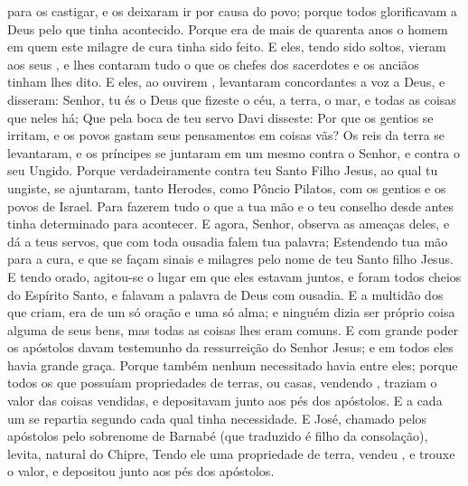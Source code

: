 {{} para os castigar, e os deixaram ir por causa do povo; porque todos glorificavam a Deus pelo que tinha acontecido.
Porque era de mais de quarenta anos o homem em quem este milagre de cura tinha sido feito.
E eles, tendo sido soltos, vieram aos seus
{} , e lhes contaram tudo o que os chefes dos sacerdotes e os anciãos tinham lhes dito.
E eles, ao ouvirem
{} , levantaram concordantes a voz a Deus, e disseram: Senhor, tu és o Deus que fizeste o céu, a terra, o mar, e todas as coisas que neles há;
Que pela boca de teu servo Davi disseste: Por que os gentios se irritam, e os povos gastam seus pensamentos em coisas vãs?
Os reis da terra se levantaram, e os príncipes se juntaram em um mesmo
{} contra o Senhor, e contra o seu Ungido.
Porque verdadeiramente contra teu Santo Filho Jesus, ao qual tu ungiste, se ajuntaram, tanto Herodes, como Pôncio Pilatos, com os gentios e os povos de Israel.
Para fazerem tudo o que a tua mão e o teu conselho desde antes tinha determinado para acontecer.
E agora, Senhor, observa as ameaças deles, e dá a teus servos, que com toda ousadia falem tua palavra;
Estendendo tua mão para a cura, e que se façam sinais e milagres pelo nome de teu Santo filho Jesus.
E tendo orado, agitou-se o lugar em que eles estavam juntos, e foram todos cheios do Espírito Santo, e falavam a palavra de Deus com ousadia.
E a multidão dos que criam, era de um só oração e uma só alma; e ninguém dizia ser próprio coisa alguma de seus bens, mas todas as coisas lhes eram comuns.
E com grande poder os apóstolos davam testemunho da ressurreição do Senhor Jesus; e em todos eles havia grande graça.
Porque também nenhum necessitado havia entre eles; porque todos os que possuíam propriedades de terras, ou casas, vendendo
{} , traziam o valor das coisas vendidas, e
{} depositavam junto aos pés dos apóstolos.
E a cada um se repartia segundo cada qual tinha necessidade.
E José, chamado pelos apóstolos pelo sobrenome de Barnabé (que traduzido é filho da consolação), levita, natural do Chipre,
Tendo ele uma propriedade de terra, vendeu
{} , e trouxe o valor, e
{} depositou junto aos pés dos apóstolos.

}

